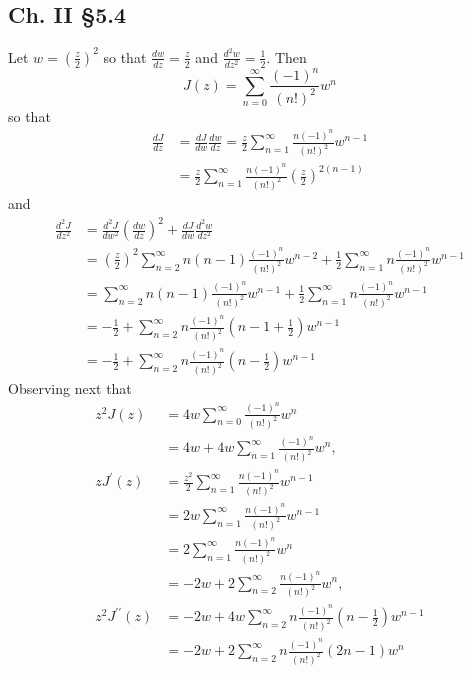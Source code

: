 \documentclass{article}
\begin{document}
\subsection*{Ch. II \S 5.4}
Let $w = \left(\frac{z}{2}\right)^2$ so that
$\frac{dw}{dz} = \frac{z}{2}$
and $\frac{d^2w}{dz^2} = \frac{1}{2}$.
Then
$$
J(z) = \sum_{n=0}^\infty \frac{(-1)^n}{(n!)^2} w^n
$$
so that
\begin{align*}
   \frac{dJ}{dz}
&= \frac{dJ}{dw}\frac{dw}{dz}
 = \frac{z}{2}\sum_{n=1}^\infty \frac{n (-1)^n}{(n!)^2} w^{n-1} \\
&= \frac{z}{2}
   \sum_{n=1}^\infty
     \frac{n (-1)^n}{(n!)^2}
     \left(\frac{z}{2}\right)^{2(n-1)}
\end{align*}
and
\begin{align*}
   \frac{d^2J}{dz^2}
&= \frac{d^2J}{dw^2}\left(\frac{dw}{dz}\right)^2
 + \frac{dJ}{dw}\frac{d^2w}{dz^2} \\
&= \left(\frac{z}{2}\right)^2
   \sum_{n=2}^\infty
     n (n-1)
     \frac{(-1)^n}{(n!)^2}
     w^{n-2}
  + \frac{1}{2}
    \sum_{n=1}^\infty
      n \frac{(-1)^n}{(n!)^2} w^{n-1} \\
&= \sum_{n=2}^\infty
     n (n-1)
     \frac{(-1)^n}{(n!)^2}
     w^{n-1}
  + \frac{1}{2}
    \sum_{n=1}^\infty
      n \frac{(-1)^n}{(n!)^2} w^{n-1} \\
&= -\frac{1}{2}
 +  \sum_{n=2}^\infty
      n \frac{(-1)^n}{(n!)^2}
      \left(n - 1 + \frac{1}{2}\right)
      w^{n-1} \\
&= -\frac{1}{2}
 +  \sum_{n=2}^\infty
      n \frac{(-1)^n}{(n!)^2}
      \left(n - \frac{1}{2}\right)
      w^{n-1}
\end{align*}
Observing next that
\begin{align*}
   z^2 J(z)
&= 4w
   \sum_{n=0}^\infty
     \frac{(-1)^n}{(n!)^2} w^n \\
&= 4w
 + 4w
   \sum_{n=1}^\infty
     \frac{(-1)^n}{(n!)^2}
     w^n, \\
   z J^\prime(z)
&= \frac{z^2}{2}
   \sum_{n=1}^\infty
     \frac{n(-1)^n}{(n!)^2} w^{n-1} \\
&= 2w
   \sum_{n=1}^\infty
     \frac{n(-1)^n}{(n!)^2} w^{n-1} \\
&= 2
   \sum_{n=1}^\infty
     \frac{n(-1)^n}{(n!)^2} w^{n} \\
&= -2w
 + 2\sum_{n=2}^\infty
     \frac{n(-1)^n}{(n!)^2}
     w^n, \\
   z^2 J^{\prime\prime}(z)
&= -2w
 + 4w
   \sum_{n=2}^\infty
     n \frac{(-1)^n}{(n!)^2}
     \left(n - \frac{1}{2}\right)
     w^{n-1} \\
&= -2w
 + 2
   \sum_{n=2}^\infty
     n \frac{(-1)^n}{(n!)^2}
     (2n-1)
     w^n
\end{align*}
\end{document}
